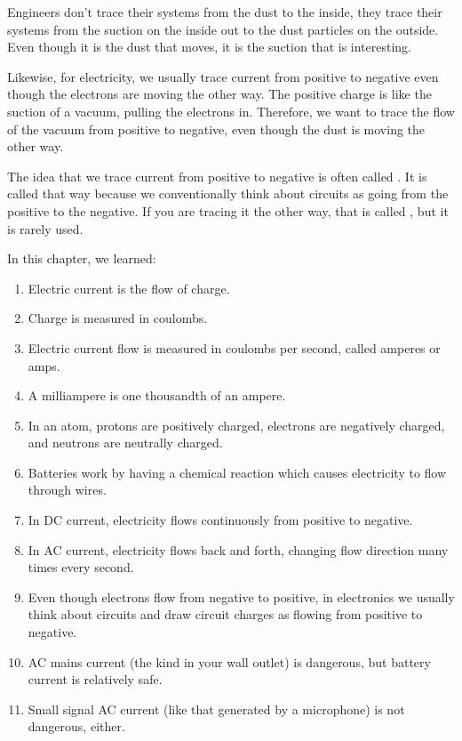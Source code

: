 Engineers don't trace their systems from the dust to the inside, they trace their systems from the suction on the inside out to the dust particles on the outside.
Even though it is the dust that moves, it is the suction that is interesting.

Likewise, for electricity, we usually trace current from positive to negative even though the electrons are moving the other way.
The positive charge is like the suction of a vacuum, pulling the electrons in.
Therefore, we want to trace the flow of the vacuum from positive to negative, even though the dust is moving the other way.

The idea that we trace current from positive to negative is often called .
It is called that way because we conventionally think about circuits as going from the positive to the negative.
If you are tracing it the other way, that is called , but it is rarely used.

\reviewsection

In this chapter, we learned:

\begin{enumerate}
\item Electric current is the flow of charge.
\item Charge is measured in coulombs.
\item Electric current flow is measured in coulombs per second, called amperes or amps.
\item A milliampere is one thousandth of an ampere.
\item In an atom, protons are positively charged, electrons are negatively charged, and neutrons are neutrally charged.
\item Batteries work by having a chemical reaction which causes electricity to flow through wires.
\item In DC current, electricity flows continuously from positive to negative.
\item In AC current, electricity flows back and forth, changing flow direction  many times every second.
\item Even though electrons flow from negative to positive, in electronics we usually think about circuits and draw circuit charges as flowing from positive to negative.
\item AC mains current (the kind in your wall outlet) is dangerous, but battery current is relatively safe.
\item Small signal AC current (like that generated by a microphone) is not dangerous, either.
\end{enumerate}

